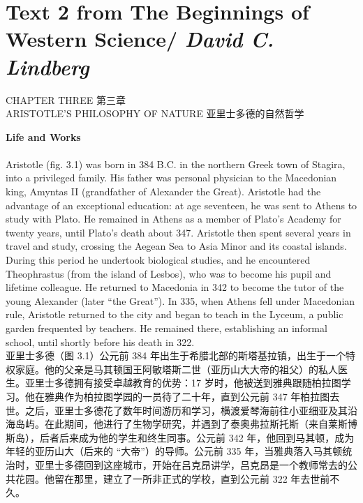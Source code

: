 \documentclass{article}
\begin{document}
\section{Text 2 from The Beginnings of Western Science/ \textit{David C. Lindberg}}
\begin{center}
CHAPTER THREE 第三章\\
ARISTOTLE'S PHILOSOPHY OF NATURE 亚里士多德的自然哲学\\
\end{center}
\textbf{Life and Works}\\
\\
Aristotle (fig. 3.1) was born in 384 B.C. in the northern Greek town of Stagira, into a privileged family. His father was personal physician to the Macedonian king, Amyntas II (grandfather of Alexander the Great). Aristotle had the advantage of an exceptional education: at age seventeen, he was sent to Athens to study with Plato. He remained in Athens as a member of Plato’s Academy for twenty years, until Plato’s death about 347. Aristotle then spent several years in travel and study, crossing the Aegean Sea to Asia Minor and its coastal islands. During this period he undertook biological studies, and he encountered Theophrastus (from the island of Lesbos), who was to become his pupil and lifetime colleague. He returned to Macedonia in 342 to become the tutor of the young Alexander (later “the Great”). In 335, when Athens fell under Macedonian rule, Aristotle returned to the city and began to teach in the Lyceum, a public garden frequented by teachers. He remained there, establishing an informal school, until shortly before his death in 322.\\
亚里士多德（图 3.1）公元前 384 年出生于希腊北部的斯塔基拉镇，出生于一个特权家庭。他的父亲是马其顿国王阿敏塔斯二世（亚历山大大帝的祖父）的私人医生。亚里士多德拥有接受卓越教育的优势：17 岁时，他被送到雅典跟随柏拉图学习。他在雅典作为柏拉图学园的一员待了二十年，直到公元前 347 年柏拉图去世。之后，亚里士多德花了数年时间游历和学习，横渡爱琴海前往小亚细亚及其沿海岛屿。在此期间，他进行了生物学研究，并遇到了泰奥弗拉斯托斯（来自莱斯博斯岛），后者后来成为他的学生和终生同事。公元前 342 年，他回到马其顿，成为年轻的亚历山大（后来的 “大帝”）的导师。公元前 335 年，当雅典落入马其顿统治时，亚里士多德回到这座城市，开始在吕克昂讲学，吕克昂是一个教师常去的公共花园。他留在那里，建立了一所非正式的学校，直到公元前 322 年去世前不久。\\
\end{document}
